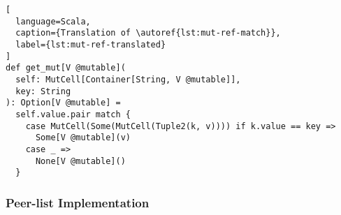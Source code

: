 \begin{lstlisting}[
  language=Scala,
  caption={Translation of \autoref{lst:mut-ref-match}},
  label={lst:mut-ref-translated}
]
def get_mut[V @mutable](
  self: MutCell[Container[String, V @mutable]],
  key: String
): Option[V @mutable] =
  self.value.pair match {
    case MutCell(Some(MutCell(Tuple2(k, v)))) if k.value == key =>
      Some[V @mutable](v)
    case _ =>
      None[V @mutable]()
  }
\end{lstlisting}

\subsubsection{Peer-list Implementation}


\iffalse
- benchmarks of Informal
  - show list map & set
  - found problem
  - strengthened post-conditions
\fi
